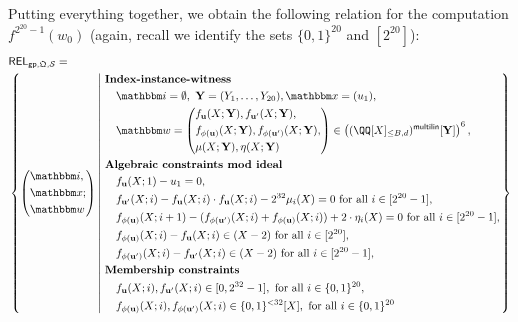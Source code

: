 \documentclass[11pt,letterpaper,usenames,dvipsnames]{article}
\begin{document}
Putting everything together, we obtain the following relation for the computation $f^{2^{20}-1}(w_0)$ (again, recall we identify the sets $\{0,1\}^{20}$ and $[2^20]$):
   \begin{equation*}
    \begin{aligned}
    &\REL_{\gparams,\megaQ,\cS} =\\ &\left\{ \left(\begin{aligned}&\idx,\\ &\inp;\\ &\wit\end{aligned}\right) \left| \ \begin{aligned}
        &\textbf{Index-instance-witness}\\
    &\quad \idx = \emptyset, \ \YY=(Y_1,\ldots, Y_{20}), \inp =(u_1),\\    
        &\quad  \wit = \left(\begin{split}&f_{\uu}(X;\YY), f_{\uu'}(X;\YY),\\ &f_{\phi(\uu)}(X;\YY),  f_{\phi(\uu')}(X;\YY),\\ &\mu(X;\YY), \eta(X;\YY)\end{split}\right) \in \left(\mainQpolyringmultilin[\YY]\right)^{6},\\
        &\textbf{Algebraic constraints mod ideal}\\
        &\quad f_{\uu}(X;1)-u_1 = 0,\\
        &\quad f_{\uu'}(X; i) - f_{\uu}(X;i)\cdot f_{\uu}(X;i) - 2^{32} \mu_i(X) = 0 \text{ for all } i\in [2^{20}-1],\\
        &\quad f_{\phi(\uu)}(X; i+1) - (f_{\phi(\uu')}(X;i) + f_{\phi(\uu)}(X;i)) + 2\cdot \eta_i(X) =0 \text{ for all } i\in [2^{20}-1],\\
        &\quad f_{\phi(\uu)}(X;i)-f_{\uu}(X;i) \in (X-2)\text{ for all } i\in [2^{20}],\\
        &\quad f_{\phi(\uu')}(X;i)-f_{\uu'}(X;i) \in (X-2)\text{ for all } i\in [2^{20}-1],\\
        &\textbf{Membership constraints}\\
        &\quad  f_{\uu}(X;i), f_{\uu'}(X;i) \in [0,2^{32}-1], \text{ for all } i \in \{0,1\}^{20},\\ 
        &\quad f_{\phi(\uu)}(X;i), f_{\phi(\uu')}(X;i) \in \{0,1\}^{<32}[X],  \text{ for all } i \in \{0,1\}^{20}
    \end{aligned} \right.\right\}
    \end{aligned}
    \end{equation*}
\end{document}
